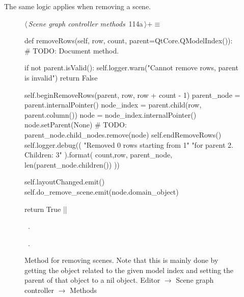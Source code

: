 \documentclass[%
    a4paper,    %
    justified,  %
    nobib,      %
    openany     %
]{tufte-book}
\makeatletter
\renewcommand{\label}[1]{\@tufte@label{##1}}%
\makeatother
\begin{document}
The same logic applies when removing a scene.

\begin{figure}[!htbp]
\begin{flushleft} \small
\begin{minipage}{\linewidth}\label{scrap51}\raggedright\small
{} $\langle\,${\itshape Scene graph controller methods}\nobreak\ {\footnotesize {114a}}$\,\rangle+\equiv$
\vspace{-1ex}
\begin{pythoncode}
def removeRows(self, row, count, parent=QtCore.QModelIndex()):
    # TODO: Document method.

    if not parent.isValid():
        self.logger.warn("Cannot remove rows, parent is invalid")
        return False

    self.beginRemoveRows(parent, row, row + count - 1)
    parent_node = parent.internalPointer()
    node_index = parent.child(row, parent.column())
    node       = node_index.internalPointer()
    node.setParent(None)
    # TODO: parent_node.child_nodes.remove(node)
    self.endRemoveRows()
    self.logger.debug((
        "Removed {0} rows starting from {1}"
        "for parent {2}. Children: {3}"
    ).format(
        count,row, parent_node,
        len(parent_node.children())
    ))

    self.layoutChanged.emit()
    self.do_remove_scene.emit(node.domain_object)

    return True
|\NWsep|
\end{pythoncode}
\vspace{1.5ex}
\footnotesize
\begin{list}{}{\setlength{\itemsep}{-\parsep}\setlength{\itemindent}{-\leftmargin}}
\item \NWtxtMacroDefBy\ .
\item \NWtxtMacroRefIn\ .

\item{}
\end{list}
\end{minipage}\vspace{4ex}
\end{flushleft}
\caption{Method for removing scenes. Note that this is mainly done by getting
  the object related to the given model index and setting the parent of that
  object to a nil object.
  \newline{}\newline{}Editor $\rightarrow$ Scene graph controller
  $\rightarrow$ Methods}
\end{figure}
\end{document}
